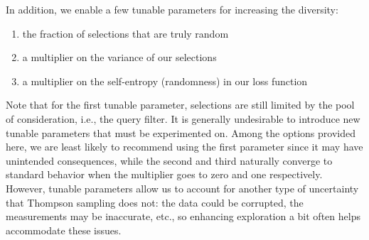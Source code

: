 \documentclass[manuscript, nonacm, screen=true]{acmart}
\begin{document}
In addition, we enable a few tunable parameters for increasing the diversity: 
\begin{enumerate}
\item the fraction of selections that are truly random
\item a multiplier on the variance of our selections
\item a multiplier on the self-entropy (randomness) in our loss function
\end{enumerate}
Note that for the first tunable parameter, selections are still limited by the pool of consideration, i.e., the query filter. It is generally undesirable to introduce new tunable parameters that must be experimented on. Among the options provided here, we are least likely to recommend using the first parameter since it may have unintended consequences, while the second and third naturally converge to standard behavior when the multiplier goes to zero and one respectively. However, tunable parameters allow us to account for another type of uncertainty that Thompson sampling does not: the data could be corrupted, the measurements may be inaccurate, etc., so enhancing exploration a bit often helps accommodate these issues.




\end{document}
